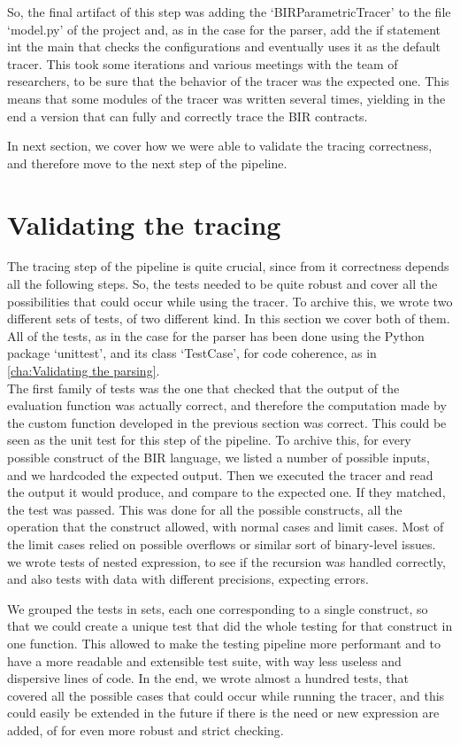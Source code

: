 So, the final artifact of this step was adding the `BIRParametricTracer' to the file
`model.py' of the project and, as in the case for the parser, add the if statement
int the main that checks the configurations and eventually uses it as the default
tracer. This took some iterations and various meetings with the team of
researchers, to be sure that the behavior of the tracer was the expected one.
This means that some modules of the tracer was written several times, yielding in
the end a version that can fully and correctly trace the BIR contracts.

In next section, we cover how we were able to validate the tracing correctness, and
therefore move to the next step of the pipeline.

\section{Validating the tracing}
\label{cha:Validating the tracing} The tracing step of the pipeline is quite crucial,
since from it correctness depends all the following steps. So, the tests needed
to be quite robust and cover all the possibilities that could occur while using
the tracer. To archive this, we wrote two different sets of tests, of two different
kind. In this section we cover both of them. All of the tests, as in the case
for the parser has been done using the Python package `unittest', and its class `TestCase',
for code coherence, as in \cref{cha:Validating the parsing}. \\

The first family of tests was the one that checked that the output of the evaluation
function was actually correct, and therefore the computation made by the custom
function developed in the previous section was correct. This could be seen as the
unit test for this step of the pipeline. To archive this, for every possible construct
of the BIR language, we listed a number of possible inputs, and we hardcoded the
expected output. Then we executed the tracer and read the output it would
produce, and compare to the expected one. If they matched, the test was passed.
This was done for all the possible constructs, all the operation that the construct
allowed, with normal cases and limit cases. Most of the limit cases relied on possible
overflows or similar sort of binary-level issues. we wrote tests of nested
expression, to see if the recursion was handled correctly, and also tests with
data with different precisions, expecting errors.

We grouped the tests in sets, each one corresponding to a single construct, so that
we could create a unique test that did the whole testing for that construct in one
function. This allowed to make the testing pipeline more performant and to have
a more readable and extensible test suite, with way less useless and dispersive lines
of code. In the end, we wrote almost a hundred tests, that covered all the
possible cases that could occur while running the tracer, and this could easily be
extended in the future if there is the need or new expression are added, of for
even more robust and strict checking. \\

